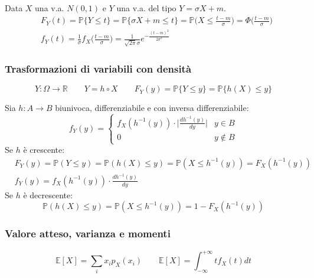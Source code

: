 \begin{definition}
	Data $X$ una v.a. $N(0,1)$ e $Y$ una v.a. del tipo $Y = \sigma X + m$.
	\begin{align}
		& F_Y(t) = \mathbb{P}\{Y \leq t\} = \mathbb{P}\{\sigma X + m \leq t\} = \mathbb{P}\bigg(X \leq \frac{t-m}{\sigma}\bigg) = \Phi \bigg(\frac{t-m}{\sigma}\bigg) \\
		& f_Y(t) = \frac{1}{\sigma}f_X\bigg(\frac{t-m}{\sigma}\bigg) = \frac{1}{\sqrt{2 \pi}\sigma} e^{-\frac{(t-m)^2}{2 \sigma^2}}
	\end{align}
\end{definition}

\subsubsection{Trasformazioni di variabili con densità}
\begin{equation}
	Y:\Omega \to \mathbb{R} \quad \quad Y = h \circ X \quad\quad F_Y(y) = \mathbb{P}\{Y\leq y\} = \mathbb{P}\{h(X) \leq y\}
\end{equation}

\begin{proposition}
	Sia $h: A \to B$ biunivoca, differenziabile e con inversa differenziabile:
	\begin{equation}
		f_Y(y) = \begin{cases}
			f_X(h^{-1}(y)) \cdot \bigg\lvert \frac{dh^{-1}(y)}{dy} \bigg\rvert & y \in B\\
			0 & y \notin B
		\end{cases}
	\end{equation}
	Se $h$ è crescente:
	\begin{align}
		& F_Y(y)=\mathbb{P}(Y\leq y) = \mathbb{P}(h(X) \leq y) = \mathbb{P}(X \leq h^{-1}(y)) = F_X(h^{-1}(y))\\
		& f_Y(y)=f_X(h^{-1}(y))\cdot \frac{dh^{-1}(y)}{dy}
	\end{align}
	Se $h$ è decrescente:
	\begin{equation}
		\mathbb{P}(h(X) \leq y) = \mathbb{P}(X \leq h^{-1}(y)) = 1 - F_X(h^{-1}(y))
	\end{equation}
\end{proposition}

\subsubsection{Valore atteso, varianza e momenti}
\begin{definition}
	\begin{equation}
		\mathbb{E}[X] = \sum_i x_i p_X(x_i) \quad\quad \mathbb{E}[X] = \int_{-\infty}^{+\infty} tf_X(t)dt
	\end{equation}
\end{definition}


